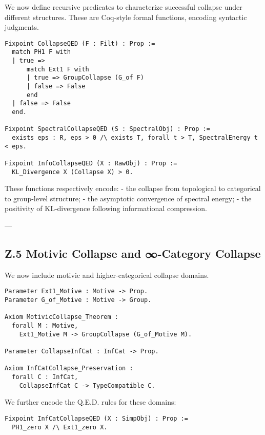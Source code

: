 \documentclass[11pt]{article}
\begin{document}
We now define recursive predicates to characterize successful collapse under different structures. These are Coq-style formal functions, encoding syntactic judgments.

\begin{lstlisting}[language=Coq, mathescape=false]
Fixpoint CollapseQED (F : Filt) : Prop :=
  match PH1 F with
  | true =>
      match Ext1 F with
      | true => GroupCollapse (G_of F)
      | false => False
      end
  | false => False
  end.

Fixpoint SpectralCollapseQED (S : SpectralObj) : Prop :=
  exists eps : R, eps > 0 /\ exists T, forall t > T, SpectralEnergy t < eps.

Fixpoint InfoCollapseQED (X : RawObj) : Prop :=
  KL_Divergence X (Collapse X) > 0.
\end{lstlisting}

These functions respectively encode:
- the collapse from topological to categorical to group-level structure;
- the asymptotic convergence of spectral energy;
- the positivity of KL-divergence following informational compression.

---

\subsection*{Z.5 Motivic Collapse and ∞-Category Collapse}

We now include motivic and higher-categorical collapse domains.

\begin{lstlisting}[language=Coq]
Parameter Ext1_Motive : Motive -> Prop.
Parameter G_of_Motive : Motive -> Group.

Axiom MotivicCollapse_Theorem :
  forall M : Motive,
    Ext1_Motive M -> GroupCollapse (G_of_Motive M).

Parameter CollapseInfCat : InfCat -> Prop.

Axiom InfCatCollapse_Preservation :
  forall C : InfCat,
    CollapseInfCat C -> TypeCompatible C.
\end{lstlisting}

We further encode the Q.E.D. rules for these domains:

\begin{lstlisting}[language=Coq]
Fixpoint InfCatCollapseQED (X : SimpObj) : Prop :=
  PH1_zero X /\ Ext1_zero X.
\end{lstlisting}
\end{document}
